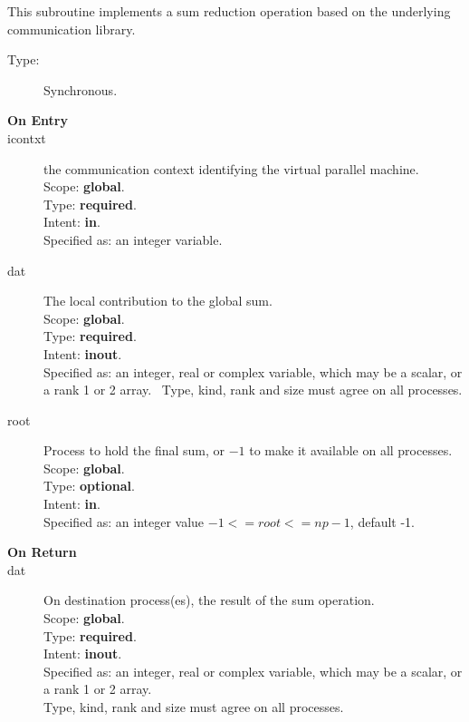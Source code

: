 

This subroutine implements a sum reduction  operation based on the
underlying communication library. 
\begin{description}
\item[Type:] Synchronous.
\item[\bf  On Entry ]
\item[icontxt] the communication context identifying the virtual
  parallel machine.\\
Scope: {\bf global}.\\
Type: {\bf required}.\\
Intent: {\bf in}.\\
Specified as: an integer variable.
\item[dat] The local contribution to the global sum.\\
Scope: {\bf global}.\\
Type: {\bf required}.\\
Intent: {\bf inout}.\\
Specified as: an integer, real or complex variable, which may be a
scalar, or a rank 1 or 2 array. \
Type, kind, rank and size must agree on all processes.
\item[root] Process to hold the final sum, or $-1$ to make it available
  on all processes.\\
Scope: {\bf global}.\\
Type: {\bf optional}.\\
Intent: {\bf in}.\\
Specified as: an integer value $-1<= root <= np-1$, default -1. \
\end{description}


\begin{description}
\item[\bf On Return]
\item[dat] On destination process(es), the result of the sum operation.\\
Scope: {\bf global}.\\
Type: {\bf required}.\\
Intent: {\bf inout}.\\
Specified as: an integer, real or complex variable, which may be a
scalar, or a rank 1 or 2 array. \\
Type, kind, rank and size must agree on all processes.
\end{description}

